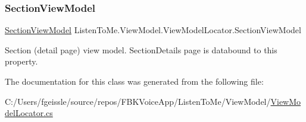 \subsubsection{\texorpdfstring{Section\+View\+Model}{SectionViewModel}}
{\footnotesize\ttfamily \mbox{\hyperlink{class_listen_to_me_1_1_view_model_1_1_section_view_model}{Section\+View\+Model}} Listen\+To\+Me.\+View\+Model.\+View\+Model\+Locator.\+Section\+View\+Model\hspace{0.3cm}{\ttfamily [get]}}



Section (detail page) view model. Section\+Details page is databound to this property. 



The documentation for this class was generated from the following file\+:\begin{DoxyCompactItemize}
\item 
C\+:/\+Users/fgeissle/source/repos/\+F\+B\+K\+Voice\+App/\+Listen\+To\+Me/\+View\+Model/\mbox{\hyperlink{_view_model_locator_8cs}{View\+Model\+Locator.\+cs}}\end{DoxyCompactItemize}
